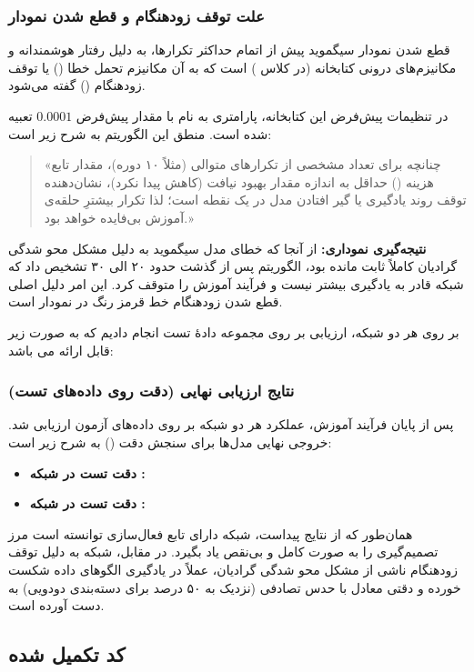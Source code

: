 \documentclass{article}
\begin{document}
\subsubsection{علت توقف زودهنگام و قطع شدن نمودار }
قطع شدن نمودار سیگموید پیش از اتمام حداکثر تکرارها، به دلیل رفتار هوشمندانه و مکانیزم‌های درونی کتابخانه  (در کلاس ) است که به آن مکانیزم تحمل خطا () یا توقف زودهنگام () گفته می‌شود.

در تنظیمات پیش‌فرض این کتابخانه، پارامتری به نام  با مقدار پیش‌فرض $0.0001$ تعبیه شده است. منطق این الگوریتم به شرح زیر است:
\begin{quote}
	«چنانچه برای تعداد مشخصی از تکرارهای متوالی (مثلاً ۱۰ دوره)، مقدار تابع هزینه () حداقل به اندازه مقدار  بهبود نیافت (کاهش پیدا نکرد)، نشان‌دهنده توقف روند یادگیری یا گیر افتادن مدل در یک نقطه است؛ لذا تکرار بیشترِ حلقه‌ی آموزش بی‌فایده خواهد بود.»
\end{quote}

\textbf{نتیجه‌گیری نموداری:} از آنجا که خطای مدل سیگموید به دلیل مشکل محو شدگی گرادیان کاملاً ثابت مانده بود، الگوریتم پس از گذشت حدود ۲۰ الی ۳۰  تشخیص داد که شبکه قادر به یادگیری بیشتر نیست و فرآیند آموزش را متوقف کرد. این امر دلیل اصلی قطع شدن زودهنگام خط قرمز رنگ در نمودار است.

بر روی هر دو شبکه، ارزیابی بر روی مجموعه دادۀ تست انجام دادیم که به صورت زیر قابل ارائه می باشد:
\subsubsection{نتایج ارزیابی نهایی (دقت روی داده‌های تست)}

پس از پایان فرآیند آموزش، عملکرد هر دو شبکه بر روی داده‌های آزمون ارزیابی شد. خروجی نهایی مدل‌ها برای سنجش دقت () به شرح زیر است:
\begin{itemize}
	\item \textbf{دقت تست در شبکه :} 
	\item \textbf{دقت تست در شبکه :} 
\end{itemize}

همان‌طور که از نتایج پیداست، شبکه دارای تابع فعال‌سازی  توانسته است مرز تصمیم‌گیری را به صورت کامل و بی‌نقص یاد بگیرد. در مقابل، شبکه  به دلیل توقف زودهنگام ناشی از مشکل محو شدگی گرادیان، عملاً در یادگیری الگوهای داده شکست خورده و دقتی معادل با حدس تصادفی (نزدیک به ۵۰ درصد برای دسته‌بندی دودویی) به دست آورده است.



\subsection{کد تکمیل شده}


\begin{latin}
	
	\begin{LTR}
		\inputminted{python}{CODE/MlHw1-Q5.py}
	\end{LTR}
\end{latin}
\end{document}
